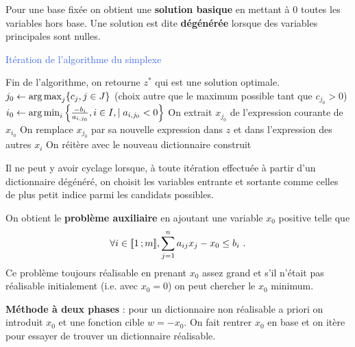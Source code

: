 Pour une base fixée on obtient une \textbf{solution basique} en mettant à $0$ toutes les variables hors base.
Une solution est dite \textbf{dégénérée} lorsque des variables principales sont nulles.

\begin{algorithm}[h]
	\caption{\textcolor{RoyalBlue}{Itération de l'algorithme du simplexe}}
	{
		Fin de l'algorithme, on retourne $z^*$ qui est une solution optimale.
	}
	\Sinon
	{
		$j_0 \leftarrow \operatorname{arg\, max}_j \{ c_j, j \in J \}$ (choix autre que le maximum possible tant que $c_{j_0} > 0$) \;
		$i_0 \leftarrow \operatorname{arg\, min}_i \left\{ \frac{- b_i}{a_{i,j_0}}, i \in I, \mid a_{i,j_0} < 0 \right\}$ \;
		On extrait $x_{j_0}$ de l'expression courante de $x_{i_0}$ \;
		On remplace $x_{j_0}$ par sa nouvelle expression dans $z$ et dans l'expression des autres $x_i$ \;
		On réitère avec le nouveau dictionnaire construit \;
	}
\end{algorithm}

\begin{thm}
	Il ne peut y avoir cyclage lorsque, à toute itération effectuée à partir d'un dictionnaire dégénéré, on choisit les variables entrante et sortante comme celles de plus petit indice parmi les candidats possibles.
\end{thm}

On obtient le \textbf{problème auxiliaire} en ajoutant une variable $x_0$ positive telle que
$$\forall i \in \mathopen{[\![}1\mathclose{}\mathpunct{};m\mathclose{]\!]}, \sum_{j = 1}^n a_{ij}x_j - x_0 \leq b_i\ .$$
Ce problème toujours réalisable en prenant $x_0$ assez grand et s'il n'était pas réalisable initialement (i.e. avec $x_0 = 0$) on peut chercher le $x_0$ minimum.

\textbf{Méthode à deux phases} : pour un dictionnaire non réalisable a priori on introduit $x_0$ et une fonction cible $w = -x_0$. On fait rentrer $x_0$ en base et on itère pour essayer de trouver un dictionnaire réalisable.
